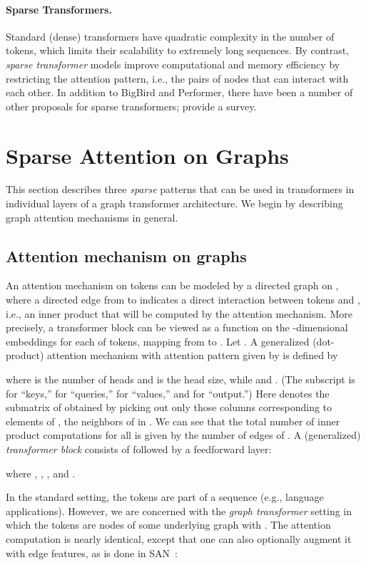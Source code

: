 \documentclass{article}
\theoremstyle{plain}
\theoremstyle{definition}
\theoremstyle{remark}
\begin{document}
\paragraph{Sparse Transformers.} Standard (dense) transformers have quadratic complexity in the number of tokens, which limits their scalability to extremely long sequences. By contrast, \emph{sparse transformer} models improve computational and memory efficiency by restricting the attention pattern, i.e., the pairs of nodes that can interact with each other.
In addition to BigBird and Performer, there have been a number of other proposals for sparse transformers; \citet{TayDBM20} provide a survey.



\section{Sparse Attention on Graphs}
This section describes three \emph{sparse} patterns that can be used in transformers in individual layers of a graph transformer architecture.
We begin by describing graph attention mechanisms in general.

\subsection{Attention mechanism on graphs}
An attention mechanism on  tokens can be modeled by a directed graph  on , where 
a directed edge from  to  indicates a direct interaction between tokens  and , i.e., an inner 
product that will be computed by the attention mechanism.
More precisely, a transformer block can be viewed as a function on the -dimensional embeddings for each of  tokens, mapping from  to . Let . A generalized (dot-product) attention mechanism  with attention pattern given by  is defined by

where  is the number of heads and  is the head size, while  and .
(The subscript  is for ``keys,''  for ``queries,''  for ``values,'' and  for ``output.'')
Here  denotes the submatrix of  obtained by picking out only those columns corresponding to elements of , the neighbors of  in . We can see that the total number of inner product computations for all  is given by the number of edges of . A (generalized) \emph{transformer block} consists of  followed by a feedforward layer:

where , , , and .

In the standard setting, the  tokens are part of a sequence (e.g., language applications). However, we are concerned with the \emph{graph transformer} setting in which the tokens are nodes of some underlying graph  with . The attention computation is nearly identical, except that one can also optionally augment it  with edge features, as is done in SAN~\citep{kreuzer2021rethinking}:
\end{document}
